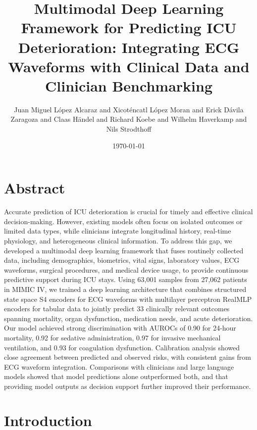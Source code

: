 \documentclass{article}
\begin{document}
        \title{Multimodal Deep Learning Framework for Predicting ICU Deterioration: Integrating ECG Waveforms with Clinical Data and Clinician Benchmarking}

        \author{Juan Miguel López Alcaraz and Xicoténcatl López Moran and Erick Dávila Zaragoza and Claas Händel and Richard Koebe and Wilhelm Haverkamp and Nils Strodthoff}

        \date{\today}

        \maketitle

        \section{Abstract}

        Accurate prediction of ICU deterioration is crucial for timely and effective clinical decision-making. However, existing models often focus on isolated outcomes or limited data types, while clinicians integrate longitudinal history, real-time physiology, and heterogeneous clinical information. To address this gap, we developed a multimodal deep learning framework that fuses routinely collected data, including demographics, biometrics, vital signs, laboratory values, ECG waveforms, surgical procedures, and medical device usage, to provide continuous predictive support during ICU stays. Using 63,001 samples from 27,062 patients in MIMIC IV, we trained a deep learning architecture that combines structured state space S4 encoders for ECG waveforms with multilayer perceptron RealMLP encoders for tabular data to jointly predict 33 clinically relevant outcomes spanning mortality, organ dysfunction, medication needs, and acute deterioration. Our model achieved strong discrimination with AUROCs of 0.90 for 24-hour mortality, 0.92 for sedative administration, 0.97 for invasive mechanical ventilation, and 0.93 for coagulation dysfunction. Calibration analysis showed close agreement between predicted and observed risks, with consistent gains from ECG waveform integration. Comparisons with clinicians and large language models showed that model predictions alone outperformed both, and that providing model outputs as decision support further improved their performance.

        \section{Introduction}
\end{document}
